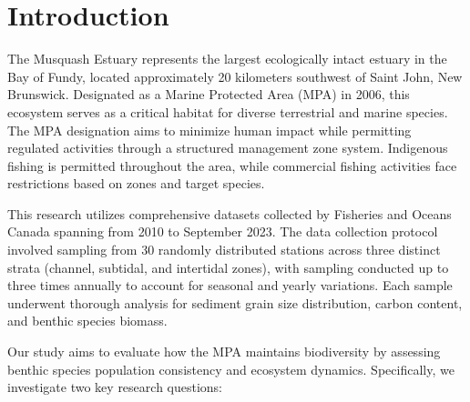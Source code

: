 \documentclass[12pt]{article}
\begin{document}


\newpage
\thispagestyle{empty}
\clearpage
\tableofcontents
\listoffigures
\listoftables
\thispagestyle{empty}
\clearpage
\setcounter{page}{1}





\section{Introduction}

\qquad The Musquash Estuary represents the largest ecologically intact estuary in the Bay of Fundy, located approximately 20 kilometers southwest of Saint John, New Brunswick. Designated as a Marine Protected Area (MPA) in 2006, this ecosystem serves as a critical habitat for diverse terrestrial and marine species. The MPA designation aims to minimize human impact while permitting regulated activities through a structured management zone system. Indigenous fishing is permitted throughout the area, while commercial fishing activities face restrictions based on zones and target species\cite{DFO2017}.

\qquad This research utilizes comprehensive datasets collected by Fisheries and Oceans Canada spanning from 2010 to September 2023. The data collection protocol involved sampling from 30 randomly distributed stations across three distinct strata (channel, subtidal, and intertidal zones), with sampling conducted up to three times annually to account for seasonal and yearly variations. Each sample underwent thorough analysis for sediment grain size distribution, carbon content, and benthic species biomass.

\qquad Our study aims to evaluate how the MPA maintains biodiversity by assessing benthic species population consistency and ecosystem dynamics. Specifically, we investigate two key research questions:
\end{document}

